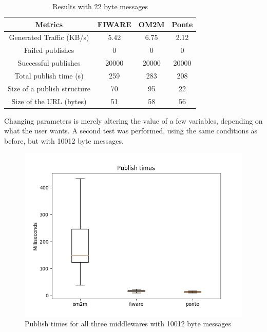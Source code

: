 \documentclass[conference]{IEEEtran}
\begin{document}
\begin{table}[htbp!]
  \centering
  \begin{tabular}{|c|c|c|c|}
    \hline 
    \textbf{Metrics} & \textbf{FIWARE} & \textbf{OM2M} & \textbf{Ponte} \\
    \hline 
    Generated Traffic (KB/s) & 5.42 & 6.75 & 2.12 \\
    \hline 
    Failed publishes & 0 & 0 & 0 \\
    \hline 
    Successful publishes & 20000 & 20000 & 20000 \\
    \hline 
    Total publish time (s) & 259 & 283 & 208 \\
    \hline 
    Size of a publish structure & 70 & 95 & 22 \\
    \hline 
    Size of the URL (bytes) & 51 & 58 & 56 \\
    \hline 
    
  \end{tabular}
  \vspace{1mm}
  \caption{Results with 22 byte messages}
  \label{tab:misc_metrics_all_22}
\end{table}

Changing parameters is merely altering the value of a few variables, depending on what the user wants. A second test was performed, using the same conditions as before, but with 10012 byte messages.

\begin{figure}[htbp!]
  \centering
  \includegraphics[width=\columnwidth]{figures/om2m_fiware_ponte_publish_times_10000.png}
  \caption{Publish times for all three middlewares with 10012 byte messages}
  \label{fig:publish_times_10000}
\end{figure}
\end{document}
